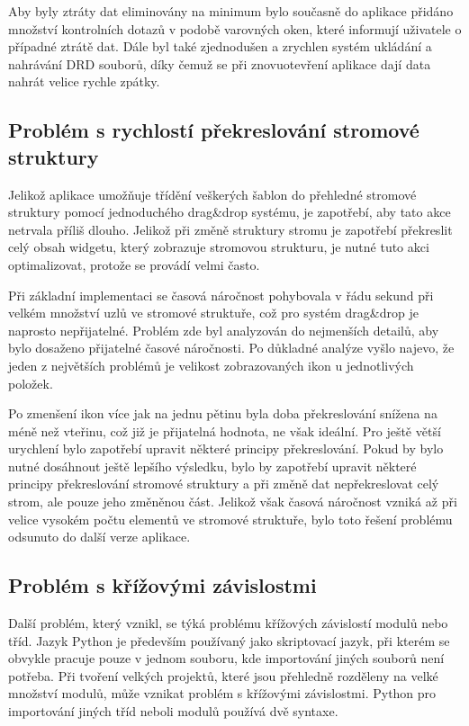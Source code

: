 \documentclass[thesis=B,czech]{resources/FITthesis}[2012/06/26]
\begin{document}
Aby byly ztráty dat eliminovány na minimum bylo současně do aplikace přidáno množství kontrolních dotazů v podobě varovných oken, které informují uživatele o případné ztrátě dat. Dále byl také zjednodušen a zrychlen systém ukládání a nahrávání DRD souborů, díky čemuž se při znovuotevření aplikace dají data nahrát velice rychle zpátky. 

	\subsection{Problém s rychlostí překreslování stromové struktury}
Jelikož aplikace umožňuje třídění veškerých šablon do přehledné stromové struktury pomocí jednoduchého drag\&drop systému, je zapotřebí, aby tato akce netrvala příliš dlouho. Jelikož při změně struktury stromu je zapotřebí překreslit celý obsah widgetu, který zobrazuje stromovou strukturu, je nutné tuto akci optimalizovat, protože se provádí velmi často. \par

Při základní implementaci se časová náročnost pohybovala v řádu sekund při velkém množství uzlů ve stromové struktuře, což pro systém drag\&drop je naprosto nepřijatelné. Problém zde byl analyzován do nejmenších detailů, aby bylo dosaženo přijatelné časové náročnosti. Po důkladné analýze vyšlo najevo, že jeden z největších problémů je velikost zobrazovaných ikon u jednotlivých položek. \par

Po zmenšení ikon více jak na jednu pětinu byla doba překreslování snížena na méně než vteřinu, což již je přijatelná hodnota, ne však ideální. Pro ještě větší urychlení bylo zapotřebí upravit některé principy překreslování. Pokud by bylo nutné dosáhnout ještě lepšího výsledku, bylo by zapotřebí upravit některé principy překreslování stromové struktury a při změně dat nepřekreslovat celý strom, ale pouze jeho změněnou část. Jelikož však časová náročnost vzniká až při velice vysokém počtu elementů ve stromové struktuře, bylo toto řešení problému odsunuto do další verze aplikace. 

	\subsection{Problém s křížovými závislostmi}
Další problém, který vznikl, se týká problému křížových závislostí modulů nebo tříd. Jazyk Python je především používaný jako skriptovací jazyk, při kterém se obvykle pracuje pouze v jednom souboru, kde importování jiných souborů není potřeba. Při tvoření velkých projektů, které jsou přehledně rozděleny na velké množství modulů, může vznikat problém s křížovými závislostmi. Python pro importování jiných tříd neboli modulů používá dvě syntaxe.
\end{document}
